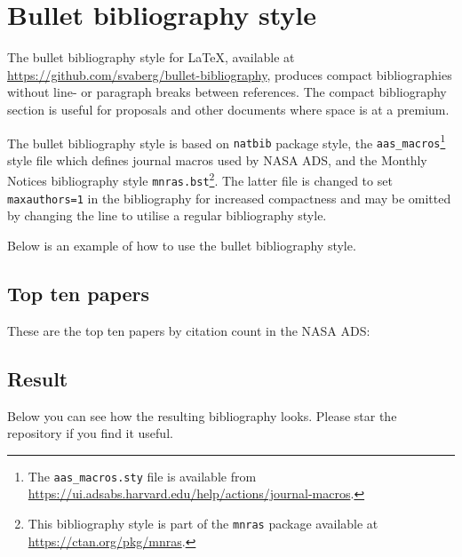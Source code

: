 \documentclass{article}
\begin{document}
\section*{Bullet bibliography style}

The bullet bibliography style for \LaTeX{}, available at \url{https://github.com/svaberg/bullet-bibliography}, produces compact bibliographies without line- or paragraph breaks between references. The compact bibliography section is useful for proposals and other documents where space is at a premium.

The bullet bibliography style is based on 
{\tt natbib} package style, 
the {\tt aas\_macros}\footnote{
    The {\tt aas\_macros.sty} file is available from \url{https://ui.adsabs.harvard.edu/help/actions/journal-macros}.
}
style file which defines journal macros used by NASA ADS, 
and 
the Monthly Notices bibliography style {\tt mnras.bst}\footnote{
    This bibliography style is part of the {\tt mnras} package available at \url{https://ctan.org/pkg/mnras}.
}. The latter file is changed to set {\tt maxauthors=1} in the bibliography for increased compactness and may be omitted by changing the 
\verb|| 
line to utilise a regular bibliography style.

Below is an example of how to use the bullet bibliography style. 

\subsection*{Top ten papers}

These are the top ten papers by citation count in the NASA ADS: \citet{1973A&A....24..337S,1998ApJ...500..525S,1998AJ....116.1009R,2016A&A...594A..13P,2020A&A...641A...6P,1999ApJ...517..565P,1981PhRvB..23.5048P,2005Natur.438..197N,2013A&A...558A..33A,2016PhRvL.116f1102A}

\subsection*{Result}
Below you can see how the resulting bibliography looks. Please star the repository if you find it useful.




\end{document}
